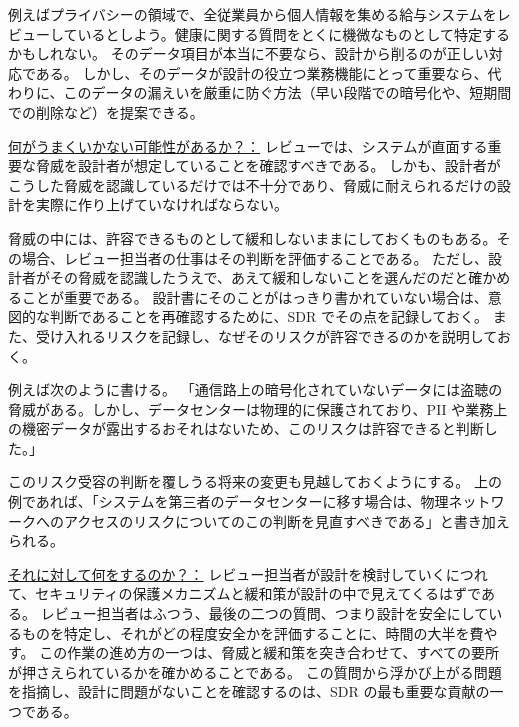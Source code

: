 \documentclass[uplatex]{jsarticle}
\def\label#1{}%
\begin{document}
\begin{exa}[給与システムにおける健康に関する質問]\label{exa:ch7-payroll-health}
例えばプライバシーの領域で、全従業員から個人情報を集める給与システムをレビューしているとしよう。健康に関する質問をとくに機微なものとして特定するかもしれない。
そのデータ項目が本当に不要なら、設計から削るのが正しい対応である。
しかし、そのデータが設計の役立つ業務機能にとって重要なら、代わりに、このデータの漏えいを厳重に防ぐ方法（早い段階での暗号化や、短期間での削除など）を提案できる。
\end{exa}

\underline{何がうまくいかない可能性があるか？：}
レビューでは、システムが直面する重要な脅威を設計者が想定していることを確認すべきである。
しかも、設計者がこうした脅威を認識しているだけでは不十分であり、脅威に耐えられるだけの設計を実際に作り上げていなければならない。

脅威の中には、許容できるものとして緩和しないままにしておくものもある。その場合、レビュー担当者の仕事はその判断を評価することである。
ただし、設計者がその脅威を認識したうえで、あえて緩和しないことを選んだのだと確かめることが重要である。
設計書にそのことがはっきり書かれていない場合は、意図的な判断であることを再確認するために、SDR でその点を記録しておく。
また、受け入れるリスクを記録し、なぜそのリスクが許容できるのかを説明しておく。

\begin{exa}[リスク受容の記録]\label{exa:ch7-accept-risk}
例えば次のように書ける。
「通信路上の暗号化されていないデータには盗聴の脅威がある。しかし、データセンターは物理的に保護されており、PII や業務上の機密データが露出するおそれはないため、このリスクは許容できると判断した。」

このリスク受容の判断を覆しうる将来の変更も見越しておくようにする。
上の例であれば、「システムを第三者のデータセンターに移す場合は、物理ネットワークへのアクセスのリスクについてのこの判断を見直すべきである」と書き加えられる。
\end{exa}

\underline{それに対して何をするのか？：}
レビュー担当者が設計を検討していくにつれて、セキュリティの保護メカニズムと緩和策が設計の中で見えてくるはずである。
レビュー担当者はふつう、最後の二つの質問、つまり設計を安全にしているものを特定し、それがどの程度安全かを評価することに、時間の大半を費やす。
この作業の進め方の一つは、脅威と緩和策を突き合わせて、すべての要所が押さえられているかを確かめることである。
この質問から浮かび上がる問題を指摘し、設計に問題がないことを確認するのは、SDR の最も重要な貢献の一つである。
\end{document}
